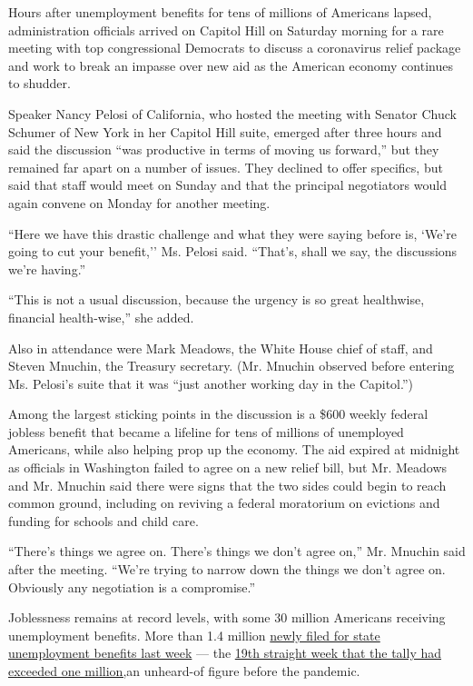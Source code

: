 Hours after unemployment benefits for tens of millions of Americans
lapsed, administration officials arrived on Capitol Hill on Saturday
morning for a rare meeting with top congressional Democrats to discuss a
coronavirus relief package and work to break an impasse over new aid as
the American economy continues to shudder.

Speaker Nancy Pelosi of California, who hosted the meeting with Senator
Chuck Schumer of New York in her Capitol Hill suite, emerged after three
hours and said the discussion ``was productive in terms of moving us
forward,'' but they remained far apart on a number of issues. They
declined to offer specifics, but said that staff would meet on Sunday
and that the principal negotiators would again convene on Monday for
another meeting.

``Here we have this drastic challenge and what they were saying before
is, `We're going to cut your benefit,'' Ms. Pelosi said. ``That's, shall
we say, the discussions we're having.''

``This is not a usual discussion, because the urgency is so great
healthwise, financial health-wise,'' she added.

Also in attendance were Mark Meadows, the White House chief of staff,
and Steven Mnuchin, the Treasury secretary. (Mr. Mnuchin observed before
entering Ms. Pelosi's suite that it was ``just another working day in
the Capitol.'')

Among the largest sticking points in the discussion is a \$600 weekly
federal jobless benefit that became a lifeline for tens of millions of
unemployed Americans, while also helping prop up the economy. The aid
expired at midnight as officials in Washington failed to agree on a new
relief bill, but Mr. Meadows and Mr. Mnuchin said there were signs that
the two sides could begin to reach common ground, including on reviving
a federal moratorium on evictions and funding for schools and child
care.

``There's things we agree on. There's things we don't agree on,'' Mr.
Mnuchin said after the meeting. ``We're trying to narrow down the things
we don't agree on. Obviously any negotiation is a compromise.''

Joblessness remains at record levels, with some 30 million Americans
receiving unemployment benefits. More than 1.4 million
\href{https://oui.doleta.gov/press/2020/073020.pdf}{newly filed for
state unemployment benefits last week} --- the
\href{https://www.nytimes.com/2020/07/30/business/economy/q2-gdp-coronavirus-economy.html}{19th
straight week that the tally had exceeded one million,}an unheard-of
figure before the pandemic.


